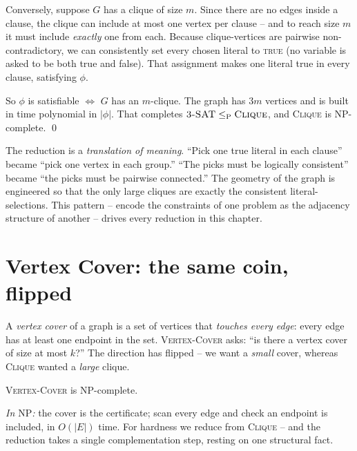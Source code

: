 Conversely, suppose $G$ has a clique of size $m$. Since there are no edges inside
a clause, the clique can include at most one vertex per clause -- and to reach
size $m$ it must include \emph{exactly} one from each. Because clique-vertices are
pairwise non-contradictory, we can consistently set every chosen literal to
\textsc{true} (no variable is asked to be both true and false). That assignment
makes one literal true in every clause, satisfying $\phi$.

So $\phi$ is satisfiable $\iff$ $G$ has an $m$-clique. The graph has $3m$ vertices
and is built in time polynomial in $|\phi|$. That completes
$\textsc{3-SAT}\le_{\mathrm{P}}\textsc{Clique}$, and \textsc{Clique} is NP-complete. \qed

\begin{intuitionbox}
The reduction is a \emph{translation of meaning}. ``Pick one true literal in each
clause'' became ``pick one vertex in each group.'' ``The picks must be logically
consistent'' became ``the picks must be pairwise connected.'' The geometry of the
graph is engineered so that the only large cliques are exactly the consistent
literal-selections. This pattern -- encode the constraints of one problem as the
adjacency structure of another -- drives every reduction in this chapter.
\end{intuitionbox}

\section{Vertex Cover: the same coin, flipped}

A \emph{vertex cover} of a graph is a set of vertices that \emph{touches every
edge}: every edge has at least one endpoint in the set. \textsc{Vertex-Cover}
asks: ``is there a vertex cover of size at most $k$?'' The direction has flipped
-- we want a \emph{small} cover, whereas \textsc{Clique} wanted a \emph{large}
clique.

\begin{theorem}
\label{ch33:vc}
\textsc{Vertex-Cover} is NP-complete.
\end{theorem}

\emph{In $\mathrm{NP}$:} the cover is the certificate; scan every edge and check
an endpoint is included, in $O(|E|)$ time. For hardness we reduce from
\textsc{Clique} -- and the reduction takes a single complementation step,
resting on one structural fact.


